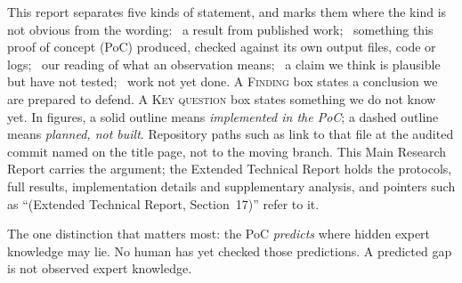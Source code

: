 \documentclass[a4paper,11pt]{scrartcl}
\begin{document}

\begin{howtoreadbox}
  This report separates five kinds of statement, and marks them where the
  kind is not obvious from the wording:
  \evlit\ a result from published work;
  \evobs\ something this proof of concept (PoC) produced, checked against
    its own output files, code or logs;
  \evint\ our reading of what an observation means;
  \evhyp\ a claim we think is plausible but have not tested;
  \evfut\ work not yet done.
  A \textsc{Finding} box states a conclusion we are prepared to defend. A
  \textsc{Key question} box states something we do not know yet.
  In figures, a solid outline means \emph{implemented in the PoC}; a
  dashed outline means \emph{planned, not built}.
  Repository paths such as  link to that file at
  the audited commit named on the title page, not to the moving  branch. This Main Research Report carries the argument; the Extended Technical Report holds the
  protocols, full results, implementation details and supplementary analysis, and pointers such
  as \enquote{(Extended Technical Report, Section~17)} refer to it.

  \smallskip
  The one distinction that matters most: the PoC \emph{predicts} where
  hidden expert knowledge may lie. No human has yet checked those
  predictions. A predicted gap is not observed expert knowledge.
\end{howtoreadbox}

\setcounter{tocdepth}{1}
\tableofcontents

\clearpage
{}















\clearpage
\printbibliography[heading=bibintoc, title={References}]
\end{document}
